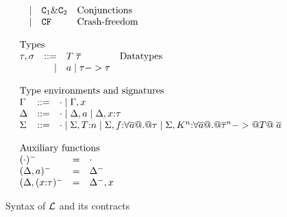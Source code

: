\begin{figure}
\[\begin{array}{l}
\begin{array}{lrll}
     & \mid & \Ct_1 \& \Ct_2             & \text{Conjunctions}   \\
     & \mid & \CF                        & \text{Crash-freedom}   \\
\end{array}
\\ \\
\begin{array}{lrll}
\multicolumn{3}{l}{\text{Types}} \\
\tau,\sigma & ::=  & T\;\taus & \text{Datatypes} \\
            & \mid & a \mid \tau -> \tau
\end{array}
\\ \\
\begin{array}{lrll}
\multicolumn{3}{l}{\text{Type environments and signatures}} \\
\Gamma & ::=  & \cdot \mid \Gamma,x \\
\Delta & ::=  & \cdot \mid \Delta,a \mid \Delta,x{:}\tau \\
\Sigma & ::=  & \cdot \mid \Sigma,T{:}n \mid \Sigma,f{:}\forall\ol{a} @.@ \tau \mid \Sigma,K^{\ar}{:}\forall\ol{a} @.@ \oln{\tau}{\ar} -> @T@\;\as
\end{array}
\\ \\
\begin{array}{lrll}
\multicolumn{3}{l}{\text{Auxiliary functions}} \\
(\cdot)^{-}            & = & \cdot \\
(\Delta,a)^{-}         & = & \Delta^{-} \\
(\Delta,(x{:}\tau)^{-} & = & \Delta^{-},x
\end{array}
\end{array}\]
\caption{Syntax of $\cal L$ and its contracts}\label{fig:syntax}
\end{figure}

